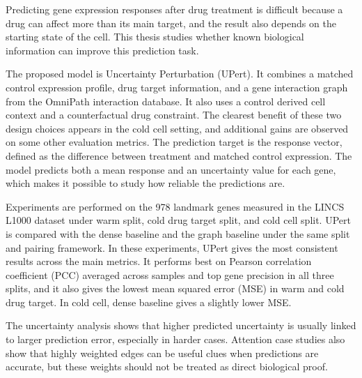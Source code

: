 \noindent Predicting gene expression responses after drug treatment is difficult because a drug can affect more than its main target, and the result also depends on the starting state of the cell. This thesis studies whether known biological information can improve this prediction task.

\noindent The proposed model is Uncertainty Perturbation (UPert). It combines a matched control expression profile, drug target information, and a gene interaction graph from the OmniPath interaction database. It also uses a control derived cell context and a counterfactual drug constraint. The clearest benefit of these two design choices appears in the cold cell setting, and additional gains are observed on some other evaluation metrics. The prediction target is the response vector, defined as the difference between treatment and matched control expression. The model predicts both a mean response and an uncertainty value for each gene, which makes it possible to study how reliable the predictions are.

\noindent Experiments are performed on the 978 landmark genes measured in the LINCS L1000 dataset under warm split, cold drug target split, and cold cell split. UPert is compared with the dense baseline and the graph baseline under the same split and pairing framework. In these experiments, UPert gives the most consistent results across the main metrics. It performs best on Pearson correlation coefficient (PCC) averaged across samples and top gene precision in all three splits, and it also gives the lowest mean squared error (MSE) in warm and cold drug target. In cold cell, dense baseline gives a slightly lower MSE.

\noindent The uncertainty analysis shows that higher predicted uncertainty is usually linked to larger prediction error, especially in harder cases. Attention case studies also show that highly weighted edges can be useful clues when predictions are accurate, but these weights should not be treated as direct biological proof.
